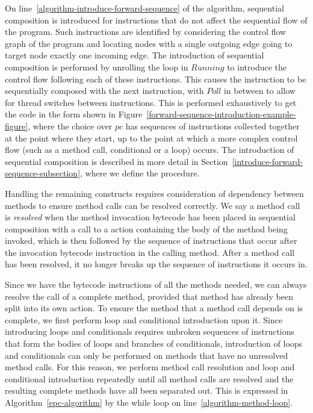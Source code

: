 On line~\ref{algorithm-introduce-forward-sequence} of the algorithm,
sequential composition is introduced for instructions that do not
affect the sequential flow of the program.
Such instructions are identified by considering the control flow graph
of the program and locating nodes with a single outgoing edge going to
target node exactly one incoming edge.
The introduction of sequential composition is performed by unrolling
the loop in $Running$ to introduce the control flow following each of
these instructions.
This causes the instruction to be sequentially composed with the next
instruction, with $Poll$ in between to allow for thread switches
between instructions.
This is performed exhaustively to get the code in the form shown in
Figure~\ref{forward-sequence-introduction-example-figure}, where the
choice over $pc$ has sequences of instructions collected together at
the point where they start, up to the point at which a more complex
control flow (such as a method call, conditional or a loop) occurs.
The introduction of sequential composition is described in more detail in
Section~\ref{introduce-forward-sequence-subsection}, where we define
the  procedure.

Handling the remaining constructs requires consideration of dependency
between methods to ensure method calls can be resolved correctly.
We say a method call is \emph{resolved} when the method invocation
bytecode has been placed in sequential composition with a call to a
\Circus{} action containing the body of the method being invoked,
which is then followed by the sequence of instructions that occur
after the invocation bytecode instruction in the calling method.
After a method call has been resolved, it no longer breaks up the
sequence of instructions it occurs in.

Since we have the bytecode instructions of all the methods needed, we
can always resolve the call of a complete method, provided that method
has already been split into its own \Circus{} action.
To ensure the method that a method call depends on is complete, we
first perform loop and conditional introduction upon it.
Since introducing loops and conditionals requires unbroken sequences
of instructions that form the bodies of loops and branches of
conditionals, introduction of loops and conditionals can only be
performed on methods that have no unresolved method calls.
For this reason, we perform method call resolution and loop and
conditional introduction repeatedly until all method calls are
resolved and the resulting complete methods have all been separated
out.
This is expressed in Algorithm~\ref{epc-algorithm} by the while loop
on line~\ref{algorithm-method-loop}.

